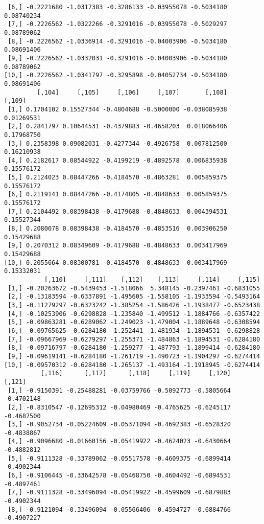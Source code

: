 \documentclass[
  letterpaper,
  DIV=11,
  numbers=noendperiod]{scrreprt}
\begin{document}
\begin{verbatim}
 [6,] -0.2221680 -1.0317383 -0.3286133 -0.03955078 -0.5034180 0.08740234
 [7,] -0.2226562 -1.0322266 -0.3291016 -0.03955078 -0.5029297 0.08789062
 [8,] -0.2226562 -1.0336914 -0.3291016 -0.04003906 -0.5034180 0.08691406
 [9,] -0.2226562 -1.0332031 -0.3291016 -0.04003906 -0.5034180 0.08789062
[10,] -0.2226562 -1.0341797 -0.3295898 -0.04052734 -0.5034180 0.08691406
         [,104]     [,105]     [,106]     [,107]       [,108]     [,109]
 [1,] 0.1704102 0.15527344 -0.4804688 -0.5000000 -0.038085938 0.01269531
 [2,] 0.2841797 0.10644531 -0.4379883 -0.4658203  0.018066406 0.17968750
 [3,] 0.2358398 0.09082031 -0.4277344 -0.4926758  0.007812500 0.16210938
 [4,] 0.2182617 0.08544922 -0.4199219 -0.4892578  0.006835938 0.15576172
 [5,] 0.2124023 0.08447266 -0.4184570 -0.4863281  0.005859375 0.15576172
 [6,] 0.2119141 0.08447266 -0.4174805 -0.4848633  0.005859375 0.15576172
 [7,] 0.2104492 0.08398438 -0.4179688 -0.4848633  0.004394531 0.15527344
 [8,] 0.2080078 0.08398438 -0.4184570 -0.4853516  0.003906250 0.15429688
 [9,] 0.2070312 0.08349609 -0.4179688 -0.4848633  0.003417969 0.15429688
[10,] 0.2055664 0.08300781 -0.4184570 -0.4848633  0.003417969 0.15332031
           [,110]     [,111]    [,112]    [,113]     [,114]     [,115]
 [1,] -0.20263672 -0.5439453 -1.518066  5.348145 -0.2397461 -0.6831055
 [2,] -0.13183594 -0.6337891 -1.495605 -1.558105 -1.1933594 -0.5493164
 [3,] -0.11279297 -0.6323242 -1.385254 -1.586426 -1.1938477 -0.6523438
 [4,] -0.10253906 -0.6298828 -1.235840 -1.499512 -1.1884766 -0.6357422
 [5,] -0.09863281 -0.6289062 -1.249023 -1.479004 -1.1889648 -0.6308594
 [6,] -0.09765625 -0.6284180 -1.252441 -1.481934 -1.1894531 -0.6298828
 [7,] -0.09667969 -0.6279297 -1.255371 -1.484863 -1.1894531 -0.6284180
 [8,] -0.09716797 -0.6284180 -1.259277 -1.487793 -1.1899414 -0.6284180
 [9,] -0.09619141 -0.6284180 -1.261719 -1.490723 -1.1904297 -0.6274414
[10,] -0.09570312 -0.6284180 -1.265137 -1.493164 -1.1918945 -0.6274414
          [,116]      [,117]      [,118]     [,119]     [,120]     [,121]
 [1,] -0.9150391 -0.25488281 -0.03759766 -0.5092773 -0.5805664 -0.4702148
 [2,] -0.8310547 -0.12695312 -0.04980469 -0.4765625 -0.6245117 -0.4687500
 [3,] -0.9052734 -0.05224609 -0.05371094 -0.4692383 -0.6528320 -0.4838867
 [4,] -0.9096680 -0.01660156 -0.05419922 -0.4624023 -0.6430664 -0.4882812
 [5,] -0.9111328 -0.33789062 -0.05517578 -0.4609375 -0.6899414 -0.4902344
 [6,] -0.9106445 -0.33642578 -0.05468750 -0.4604492 -0.6894531 -0.4897461
 [7,] -0.9111328 -0.33496094 -0.05419922 -0.4599609 -0.6879883 -0.4902344
 [8,] -0.9121094 -0.33496094 -0.05566406 -0.4594727 -0.6884766 -0.4907227

\end{verbatim}
\end{document}
